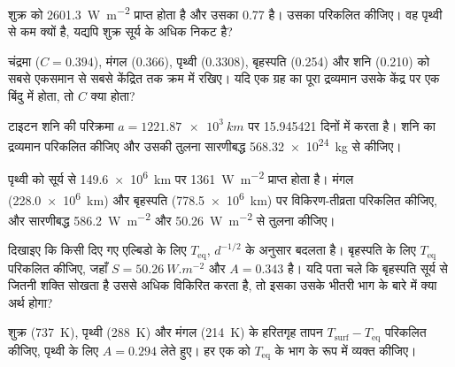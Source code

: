 \begin{exercise}[$\star$]\label{exo:b1:comparative-planetology:3}
शुक्र को \qty{2601.3}{W.m^{-2}} प्राप्त होता है और उसका  0.77 है। उसका 
परिकलित कीजिए। वह पृथ्वी से कम क्यों है, यद्यपि शुक्र सूर्य के अधिक निकट है?
\end{exercise}

\begin{exercise}[$\star$]\label{exo:b1:comparative-planetology:4}
चंद्रमा ($C = 0.394$), मंगल (0.366), पृथ्वी (0.3308), बृहस्पति (0.254) और शनि (0.210) को सबसे
एकसमान से सबसे केंद्रित तक क्रम में रखिए। यदि एक ग्रह का पूरा द्रव्यमान उसके केंद्र पर एक बिंदु में
होता, तो $C$ क्या होता?
\end{exercise}

\begin{exercise}[$\star\star$]\label{exo:b1:comparative-planetology:5}
टाइटन शनि की परिक्रमा $a = \qty{1221.87e3}{km}$ पर \num{15.945421} दिनों में करता है। शनि का द्रव्यमान
परिकलित कीजिए और उसकी तुलना सारणीबद्ध \qty{568.32e24}{kg} से कीजिए।
\end{exercise}

\begin{exercise}[$\star\star$]\label{exo:b1:comparative-planetology:6}
पृथ्वी को सूर्य से \qty{149.6e6}{km} पर \qty{1361}{W.m^{-2}} प्राप्त होता है। मंगल (\qty{228.0e6}{km}) और
बृहस्पति (\qty{778.5e6}{km}) पर विकिरण-तीव्रता परिकलित कीजिए, और सारणीबद्ध \qty{586.2}{W.m^{-2}} और
\qty{50.26}{W.m^{-2}} से तुलना कीजिए।
\end{exercise}

\begin{exercise}[$\star\star$]\label{exo:b1:comparative-planetology:7}
दिखाइए कि किसी दिए गए एल्बिडो के लिए $T_\mathrm{eq}$, $d^{-1/2}$ के अनुसार बदलता है। बृहस्पति के लिए $T_\mathrm{eq}$ परिकलित कीजिए, जहाँ
$S = \qty{50.26}{W.m^{-2}}$ और $A = 0.343$ है। यदि पता चले कि बृहस्पति
सूर्य से जितनी शक्ति सोखता है उससे अधिक विकिरित करता है, तो इसका उसके भीतरी भाग के बारे में क्या अर्थ होगा?
\end{exercise}

\begin{exercise}[$\star\star$]\label{exo:b1:comparative-planetology:8}
शुक्र (\qty{737}{K}), पृथ्वी (\qty{288}{K}) और मंगल (\qty{214}{K}) के हरितगृह तापन $T_\mathrm{surf} - T_\mathrm{eq}$
परिकलित कीजिए, पृथ्वी के लिए $A = 0.294$ लेते हुए। हर एक को $T_\mathrm{eq}$ के भाग के रूप में व्यक्त कीजिए।
\end{exercise}

